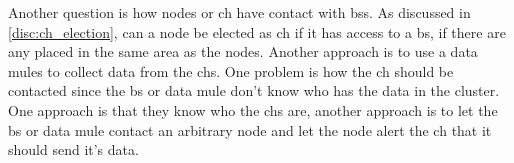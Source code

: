 \documentclass[USenglish]{uit-thesis}
\begin{document}
Another question is how nodes or \gls{ch} have contact with \glspl{bs}. As discussed in \autoref{disc:ch_election}, can a node be elected as \gls{ch} if it has access to a \gls{bs}, if there are any placed in the same area as the nodes. Another approach is to use a data mules to collect data from the \glspl{ch}.
One problem is how the \gls{ch} should be contacted since the \gls{bs} or data mule don't know who has the data in the cluster. One approach is that they know who the \glspl{ch} are, another approach is to let the \gls{bs} or data mule contact an arbitrary node and let the node alert the \gls{ch} that it should send it's data.







\end{document}
